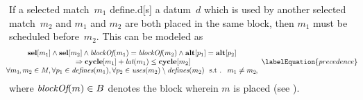 If a selected \gls{match}~$m_1$ \gls{define.d}[s] a \gls{datum}~$d$ which is
used by another selected \gls{match}~$m_2$ and $m_1$ and $m_2$ are both placed
in the same \gls{block}, then $m_1$ must be scheduled before~$m_2$.
%
This can be modeled as
%
\begin{equation}
  \hspace*{-1em}
  \begin{array}{c}
    \mVar{sel}[m_1] \mAnd \mVar{sel}[m_2]
    \mAnd \mBlockOf(m_1) = \mBlockOf(m_2)
    \mAnd \mVar{alt}[p_1] = \mVar{alt}[p_2] \\
    \mbox{} \mImp
    \mVar{cycle}[m_1] + \mLat(m_1) \leq \mVar{cycle}[m_2] \\
    \forall m_1 \hspace{-1pt}, m_2 \in \mMatchSet,
    \forall p_1 \in \mDefines(m_1),
    \forall p_2 \in \mUses(m_2) \setminus \mDefines(m_2)
    \text{ \st }
    m_1 \neq m_2 \hspace{-.8pt},
  \end{array}
  \labelEquation{precedence}
\end{equation}
%
where \mbox{$\operatorname{\textit{blockOf}}(m) \in B$} denotes the block wherein $m$ is
placed (see ).

